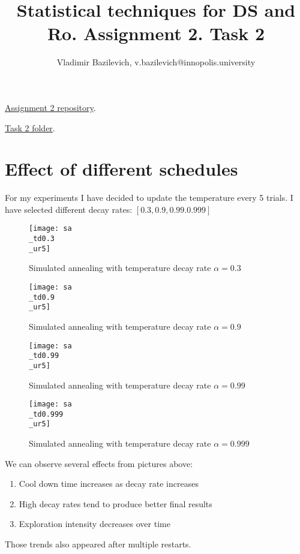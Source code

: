 \documentclass{article}
\title{Statistical techniques for DS and Ro. Assignment 2. Task 2}
\author{Vladimir Bazilevich, v.bazilevich@innopolis.university}
\begin{document}
	\maketitle
	
	\href{https://github.com/vBazilevich/Spring2023-statistical-methods-for-DS-and-Ro-assignment2}{Assignment 2 repository}.
	
	\href{https://github.com/vBazilevich/Spring2023-statistical-methods-for-DS-and-Ro-assignment2/tree/master/task2}{Task 2 folder}.
	
	\section{Effect of different schedules}
	For my experiments I have decided to update the temperature every 5 trials. I have selected different decay rates: $[0.3, 0.9, 0.99. 0.999]$
	
	\begin{figure}[H]
		\texttt{[image: sa\\\_td0.3\\\_ur5]}
		\caption{Simulated annealing with temperature decay rate $\alpha=0.3$}
		\centering
	\end{figure}

	\begin{figure}[H]
		\texttt{[image: sa\\\_td0.9\\\_ur5]}
		\caption{Simulated annealing with temperature decay rate $\alpha=0.9$}
		\centering
	\end{figure}

	\begin{figure}[H]
		\texttt{[image: sa\\\_td0.99\\\_ur5]}
		\caption{Simulated annealing with temperature decay rate $\alpha=0.99$}
		\centering
	\end{figure}

	\begin{figure}[H]
		\texttt{[image: sa\\\_td0.999\\\_ur5]}
		\caption{Simulated annealing with temperature decay rate $\alpha=0.999$}
		\centering
	\end{figure}

	We can observe several effects from pictures above:
	\begin{enumerate}
		\item Cool down time increases as decay rate increases
		\item High decay rates tend to produce better final results
		\item Exploration intensity decreases over time
	\end{enumerate}

	Those trends also appeared after multiple restarts.
\end{document}
